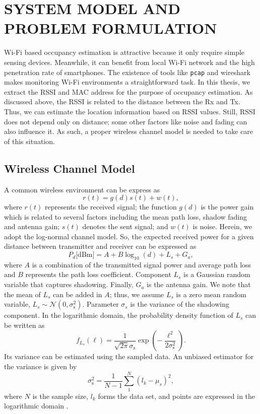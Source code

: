 \chapter{SYSTEM MODEL AND PROBLEM FORMULATION}

Wi-Fi based occupancy estimation is attractive because it only require simple sensing devices.
Meanwhile, it can benefit from local Wi-Fi network and the high penetration rate of smartphones.
The existence of tools like \texttt{pcap} and wireshark makes monitoring Wi-Fi environments a straightforward task.
In this thesis, we extract the RSSI and MAC address for the purpose of occupancy estimation.
As discussed above, the RSSI is related to the distance between the Rx and Tx.
Thus, we can estimate the location information based on RSSI values.
Still, RSSI does not depend only on distance; some other factors like noise and fading can also influence it.
As such, a proper wireless channel model is needed to take care of this situation.


\section{Wireless Channel Model}
\label{section:channel}

A common wireless environment can be express as
\begin{equation*}
r (t) = g (d) s (t) + w (t) ,
\end{equation*}
where $r (t)$ represents the received signal; the function $g (d)$ is the power gain which is related to several factors including the mean path loss, shadow fading and antenna gain; $s (t)$ denotes the sent signal; and $w (t)$ is noise.
Herein, we adopt the log-normal channel model.
So, the expected received power for a given distance between transmitter and receiver can be expressed as
\begin{equation} \label{channel}
P_{d} \text{[dBm]}
= A + B \log_{10}(d) + L_{s} + G_{a} ,
\end{equation}
where $A$ is a combination of the transmitted signal power and average path loss
and $B$ represents the path loss coefficient.
Component $L_{s}$ is a Gaussian random variable that captures shadowing.
Finally, $G_{a}$ is the antenna gain.
We note that the mean of $L_{s}$ can be added in $A$; thus, we assume $L_{s}$ is a zero mean random variable, $L_{s} \sim \mathcal{N}(0,\sigma_{\mathrm{s}}^2)$.
Parameter $\sigma_{s}$ is the variance of the shadowing component.
In the logarithmic domain, the probability density function of $L_{s}$ can be written as
\begin{equation*}
f_{L_{s}} (\ell)
= \frac{1}{\sqrt{2 \pi} \sigma_{\mathrm{s}}} 
\exp \left( - \frac{\ell^2}{2 \sigma_{\mathrm{s}}^2} \right) .
\end{equation*}
Its variance can be estimated using the sampled data.
An unbiased estimator for the variance is given by~\cite{zwillinger1995crc}
\begin{equation*}
\sigma_{\mathrm{s}}^2 = \frac{1}{N-1} \sum_{1}^{N} (l_{k}-\mu_{s})^2 ,
\end{equation*} 
where $N$ is the sample size, $l_{k}$ forms the data set, and points are expressed in the logarithmic domain \cite{kay1993fundamentals,poor1998introduction}.

